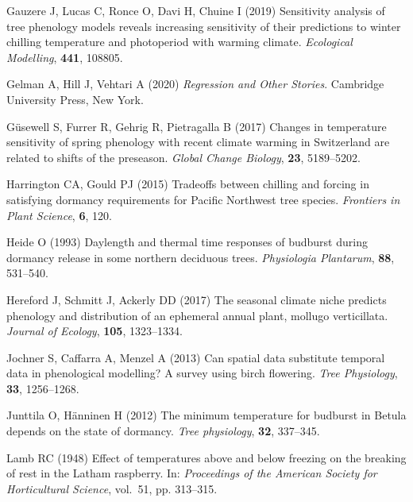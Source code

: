 \documentclass[11pt,letter]{article}
\begin{document}
\begin{thebibliography}{63}
Gauzere J, Lucas C, Ronce O, Davi H, Chuine I (2019) Sensitivity analysis of
  tree phenology models reveals increasing sensitivity of their predictions to
  winter chilling temperature and photoperiod with warming climate.
\newblock \emph{Ecological Modelling}, \textbf{441}, 108805.

Gelman A, Hill J, Vehtari A (2020) \emph{Regression and Other Stories}.
\newblock Cambridge University Press, New York.

G{\"u}sewell S, Furrer R, Gehrig R, Pietragalla B (2017) {Changes in
  temperature sensitivity of spring phenology with recent climate warming in
  Switzerland are related to shifts of the preseason}.
\newblock \emph{Global Change Biology}, \textbf{23}, 5189--5202.

Harrington CA, Gould PJ (2015) {Tradeoffs between chilling and forcing in
  satisfying dormancy requirements for Pacific Northwest tree species}.
\newblock \emph{Frontiers in Plant Science}, \textbf{6}, 120.

Heide O (1993) Daylength and thermal time responses of budburst during dormancy
  release in some northern deciduous trees.
\newblock \emph{Physiologia Plantarum}, \textbf{88}, 531--540.

Hereford J, Schmitt J, Ackerly DD (2017) The seasonal climate niche predicts
  phenology and distribution of an ephemeral annual plant, mollugo
  verticillata.
\newblock \emph{Journal of Ecology}, \textbf{105}, 1323--1334.

Jochner S, Caffarra A, Menzel A (2013) {Can spatial data substitute temporal
  data in phenological modelling? A survey using birch flowering}.
\newblock \emph{Tree Physiology}, \textbf{33}, 1256--1268.

Junttila O, H{\"a}nninen H (2012) {The minimum temperature for budburst in
  Betula depends on the state of dormancy}.
\newblock \emph{Tree physiology}, \textbf{32}, 337--345.

Lamb RC (1948) {Effect of temperatures above and below freezing on the breaking
  of rest in the Latham raspberry}.
\newblock In: \emph{Proceedings of the American Society for Horticultural
  Science}, vol.~51, pp. 313--315.


\end{thebibliography}
\end{document}
